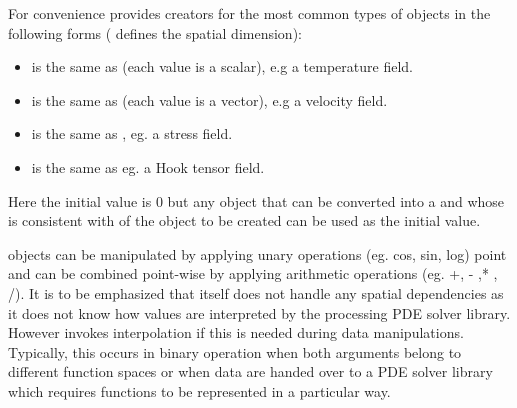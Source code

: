 For convenience \escript provides creators for the most common types
of \Data objects in the following forms ( defines the 
spatial dimension):
\begin{itemize}
\item {} is the same as  (each value is a scalar), 
e.g a temperature field. 
\item {} is the same as  (each value is a vector), e.g
a velocity field.   
\item {} is the same as ,
eg. a stress field.  
\item {} is the same as 
eg. a Hook tensor field.   
\end{itemize}
Here the initial value is $0$ but any object that can be converted into a \numarrayNA and whose \Shape
is consistent with \Shape of the \Data object to be created can be used as the initial value.

\Data objects can be manipulated by applying unary operations (eg. cos, sin, log) point
and can be combined point-wise by applying arithmetic operations (eg. +, - ,* , /). 
It is to be emphasized that \escript itself does not handle any spatial dependencies as 
it does not know how values are interpreted by the processing PDE solver library. 
However \escript invokes interpolation if this is needed during data manipulations. 
Typically, this occurs in binary operation when both arguments belong to different
function spaces or when data are handed over to a PDE solver library 
which requires functions to be represented in a particular way. 


